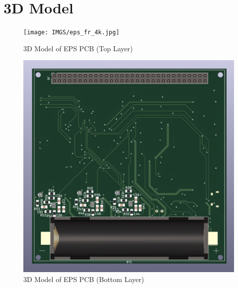  
\section{3D Model}

 
 \begin{figure}[H]
 	\centering
 	\texttt{[image: IMGS/eps\_fr\_4k.jpg]}
 	\caption{\centering 3D Model of EPS PCB (Top Layer)}
 	\label{fig:eps3dfr}
 \end{figure}
 
 
  \begin{figure}[H]
 	\centering
 	\includegraphics[width=0.99\columnwidth]{IMGS/eps_bk-4k.jpg}
 	\caption{\centering 3D Model of EPS PCB (Bottom Layer)}
 	\label{fig:eps3dbk}
 \end{figure}
 
